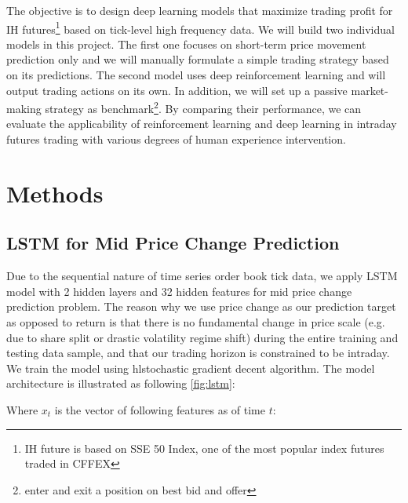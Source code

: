 \documentclass{article}
\begin{document}
The objective is to design deep learning models that maximize trading profit for IH futures\footnote{IH future is based on SSE 50 Index, one of the most popular index futures traded in CFFEX} based on tick-level high frequency data. We will build two individual models in this project. The first one focuses on short-term price movement prediction only and we will manually formulate a simple trading strategy based on its predictions. The second model uses deep reinforcement learning and will output trading actions on its own. In addition, we will set up a passive market-making strategy as benchmark\footnote{enter and exit a position on best bid and offer}. By comparing their performance, we can evaluate the applicability of reinforcement learning and deep learning in intraday futures trading with various degrees of human experience intervention.

\section{Methods}

\subsection{LSTM for Mid Price Change Prediction}

Due to the sequential nature of time series order book tick data, we apply LSTM model with 2 hidden layers and 32 hidden features for mid price change prediction problem. The reason why we use price change as our prediction target as opposed to return is that there is no fundamental change in price scale (e.g. due to share split or drastic volatility regime shift) during the entire training and testing data sample, and that our trading horizon is constrained to be intraday. We train the model using hl{stochastic gradient decent algorithm}. The model architecture is illustrated as following \ref{fig:lstm}:

Where $x_t$ is the vector of following features as of time $t$:
\end{document}
